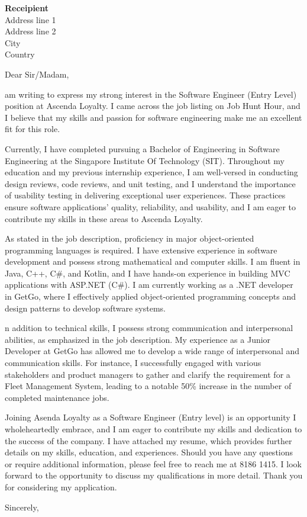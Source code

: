 \documentclass[a4paper, 11pt]{letter}
\begin{document}
\begin{letter}
{   %
\textbf{Receipient} \\
Address line 1 \\
Address line 2 \\
City \\
Country
}

\makecovertitle

\contact

\opening{Dear Sir/Madam,}

am writing to express my strong interest in the Software Engineer (Entry Level) position at Ascenda Loyalty. I came across the job listing on Job Hunt Hour, and I believe that my skills and passion for software engineering make me an excellent fit for this role. 

Currently, I have completed pursuing a Bachelor of Engineering in Software Engineering at the Singapore Institute Of Technology (SIT). Throughout my education and my previous internship experience, I am well-versed in conducting design reviews, code reviews, and unit testing, and I understand the importance of usability testing in delivering exceptional user experiences. These practices ensure software applications' quality, reliability, and usability, and I am eager to contribute my skills in these areas to Ascenda Loyalty. 

As stated in the job description, proficiency in major object-oriented programming languages is required. I have extensive experience in software development and possess strong mathematical and computer skills. I am fluent in Java, C++, C\#, and Kotlin, and I have hands-on experience in building MVC applications with ASP.NET (C\#). I am currently working as a .NET developer in GetGo, where I effectively applied object-oriented programming concepts and design patterns to develop software systems.

n addition to technical skills, I possess strong communication and interpersonal abilities, as emphasized in the job description. My experience as a Junior Developer at GetGo has allowed me to develop a wide range of interpersonal and communication skills. For instance, I successfully engaged with various stakeholders and product managers to gather and clarify the requirement for a Fleet Management System, leading to a notable 50\% increase in the number of completed maintenance jobs. 

Joining Asenda Loyalty as a Software Engineer (Entry level) is an opportunity I wholeheartedly embrace, and I am eager to contribute my skills and dedication to the success of the company. I have attached my resume, which provides further details on my skills, education, and experiences. Should you have any questions or require additional information, please feel free to reach me at 8186 1415. I look forward to the opportunity to discuss my qualifications in more detail. Thank you for considering my application.


\closing{Sincerely,}
\end{letter}
\end{document}
